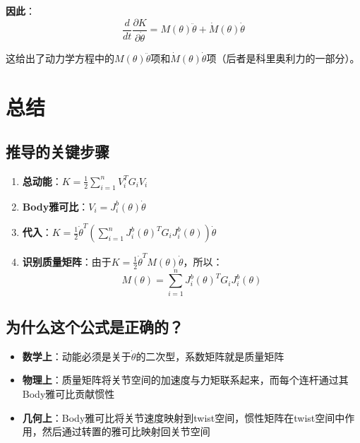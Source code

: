 \documentclass[12pt,a4paper]{article}
\begin{document}
\textbf{因此}：
\begin{equation}
\frac{d}{dt}\frac{\partial K}{\partial \dot{\theta}} = M(\theta) \ddot{\theta} + \dot{M}(\theta) \dot{\theta}
\end{equation}

这给出了动力学方程中的$M(\theta)\ddot{\theta}$项和$\dot{M}(\theta)\dot{\theta}$项（后者是科里奥利力的一部分）。

\section{总结}

\subsection{推导的关键步骤}

\begin{enumerate}
\item \textbf{总动能}：$K = \frac{1}{2}\sum_{i=1}^{n} V_i^T G_i V_i$

\item \textbf{Body雅可比}：$V_i = J_i^b(\theta) \dot{\theta}$

\item \textbf{代入}：$K = \frac{1}{2}\dot{\theta}^T \left(\sum_{i=1}^{n} J_i^b(\theta)^T G_i J_i^b(\theta)\right) \dot{\theta}$

\item \textbf{识别质量矩阵}：由于$K = \frac{1}{2}\dot{\theta}^T M(\theta) \dot{\theta}$，所以：
\begin{equation}
M(\theta) = \sum_{i=1}^{n} J_i^b(\theta)^T G_i J_i^b(\theta)
\end{equation}
\end{enumerate}

\subsection{为什么这个公式是正确的？}

\begin{itemize}
\item \textbf{数学上}：动能必须是关于$\dot{\theta}$的二次型，系数矩阵就是质量矩阵
\item \textbf{物理上}：质量矩阵将关节空间的加速度与力矩联系起来，而每个连杆通过其Body雅可比贡献惯性
\item \textbf{几何上}：Body雅可比将关节速度映射到twist空间，惯性矩阵在twist空间中作用，然后通过转置的雅可比映射回关节空间
\end{itemize}
\end{document}
